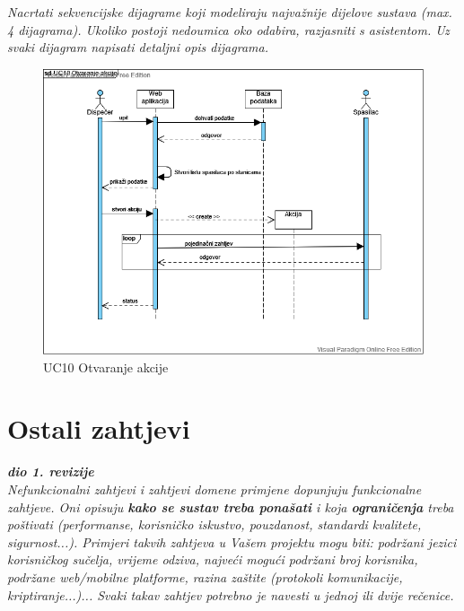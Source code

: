 				\textit{Nacrtati sekvencijske dijagrame koji modeliraju najvažnije dijelove sustava (max. 4 dijagrama). Ukoliko postoji nedoumica oko odabira, razjasniti s asistentom. Uz svaki dijagram napisati detaljni opis dijagrama.}
				\begin{figure}[H]
					\includegraphics[scale=0.5]{slike/dispatcher_sequence.PNG} %
					\centering
					\caption{UC10 Otvaranje akcije}
					\label{fig:promjene}
				\end{figure}
				\eject
	
		\section{Ostali zahtjevi}
		
			\textbf{\textit{dio 1. revizije}}\\
		 
			 \textit{Nefunkcionalni zahtjevi i zahtjevi domene primjene dopunjuju funkcionalne zahtjeve. Oni opisuju \textbf{kako se sustav treba ponašati} i koja \textbf{ograničenja} treba poštivati (performanse, korisničko iskustvo, pouzdanost, standardi kvalitete, sigurnost...). Primjeri takvih zahtjeva u Vašem projektu mogu biti: podržani jezici korisničkog sučelja, vrijeme odziva, najveći mogući podržani broj korisnika, podržane web/mobilne platforme, razina zaštite (protokoli komunikacije, kriptiranje...)... Svaki takav zahtjev potrebno je navesti u jednoj ili dvije rečenice.}
			 
			 
			 
	